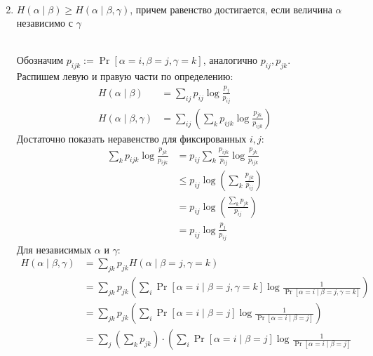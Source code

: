 \begin{prop}
\begin{enumerate}
\begin{proof*}
\begin{align*}
    			\end{align*}
			\end{proof*}
		\item $ H( \alpha \mid \beta) \ge H( \alpha  \mid \beta, \gamma ) $, причем равенство достигается, если величина $ \alpha$ независимо с $ \gamma$
		    \begin{proof*}
		        \\
		        Обозначим $ p_{ijk} := \Pr[\alpha = i, \beta = j, \gamma = k]$, аналогично $ p_{ij}, p_{jk}$.\\
		        Распишем левую и правую части по определению:
		        \begin{align*}
		            H(\alpha \mid \beta) &= \sum_{ij} p_{ij} \log \frac{p_j}{p_{ij}} \\
		            H(\alpha \mid \beta, \gamma) &= \sum_{ij} \left( \sum_k p_{ijk} \log \frac{p_{jk}}{p_{ijk}} \right)
		        \end{align*}
		        Достаточно показать неравенство для фиксированных $ i, j$:
		        \begin{align*}
		            \sum_k p_{ijk} \log \frac{p_{jk}}{p_{ijk}} 
		            &= p_{ij} \sum_k \frac{p_{ijk}}{p_{ij}} \log \frac{p_{jk}}{p_{ijk}}
		            \tag{чтобы сумма коэффициентов была 1} \\
		            &\le p_{ij} \log \left( \sum_k \frac{p_{jk}}{p_{ij}} \right)
		            \tag{по неравенству Йенсена} \\
		            &= p_{ij} \log \left( \frac{ \sum_k p_{jk}}{p_{ij}} \right) \\
		            &= p_{ij} \log \frac{p_j}{p_{ij}}
		        \end{align*}
		        Для независимых $ \alpha$ и $ \gamma$:
		        \begin{align*}
		            H(\alpha \mid \beta, \gamma) 
		            &= \sum_{jk} p_{jk} H(\alpha \mid \beta = j, \gamma = k) \\
		            &= \sum_{jk} p_{jk} \left( 
		                \sum_i \Pr[\alpha = i \mid \beta = j, \gamma = k] \log \frac{1}{\Pr[\alpha = i \mid \beta = j, \gamma = k]}
		            \right) \\
		            &= \sum_{jk} p_{jk} \left( 
		                \sum_i \Pr[\alpha = i \mid \beta = j] \log \frac{1}{\Pr[\alpha = i \mid \beta = j]}
		            \right)
		            \tag{по независимости} \\
		            &= \sum_j \left( \sum_k p_{jk} \right) \cdot \left( 
		                \sum_i \Pr[\alpha = i \mid \beta = j] \log \frac{1}{\Pr[\alpha = i \mid \beta = j]}

\end{align*}
\end{proof*}
\end{enumerate}
\end{prop}

